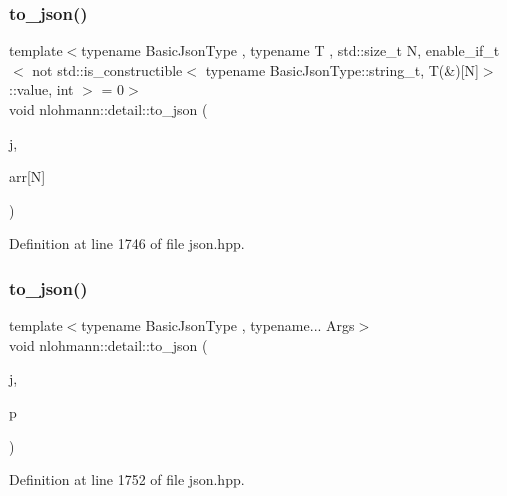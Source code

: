 \mbox{\label{namespacenlohmann_1_1detail_a8c4d301fc51996e3c5c1257fb92ace20}} 
\subsubsection{\texorpdfstring{to\+\_\+json()}{to\_json()}\hspace{0.1cm}{\footnotesize\ttfamily [14/16]}}
{\footnotesize\ttfamily template$<$typename Basic\+Json\+Type , typename T , std\+::size\+\_\+t N, enable\+\_\+if\+\_\+t$<$ not std\+::is\+\_\+constructible$<$ typename Basic\+Json\+Type\+::string\+\_\+t, T(\&)\mbox{[}\+N\mbox{]}$>$\+::value, int $>$  = 0$>$ \\
void nlohmann\+::detail\+::to\+\_\+json (\begin{DoxyParamCaption}\item[{Basic\+Json\+Type \&}]{j,  }\item[{T(\&)}]{arr\mbox{[}\+N\mbox{]} }\end{DoxyParamCaption})}



Definition at line 1746 of file json.\+hpp.

\mbox{\label{namespacenlohmann_1_1detail_aa30611f74062379d3420c40487cf3bb3}} 
\subsubsection{\texorpdfstring{to\+\_\+json()}{to\_json()}\hspace{0.1cm}{\footnotesize\ttfamily [15/16]}}
{\footnotesize\ttfamily template$<$typename Basic\+Json\+Type , typename... Args$>$ \\
void nlohmann\+::detail\+::to\+\_\+json (\begin{DoxyParamCaption}\item[{Basic\+Json\+Type \&}]{j,  }\item[{const std\+::pair$<$ Args... $>$ \&}]{p }\end{DoxyParamCaption})}



Definition at line 1752 of file json.\+hpp.

